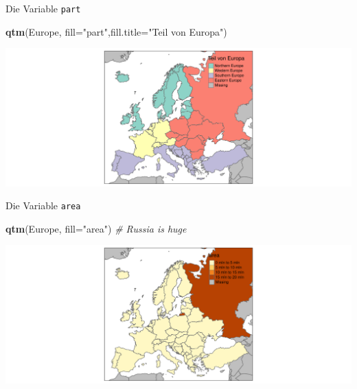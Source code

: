 \documentclass[ignorenonframetext,]{beamer}
\newenvironment{Shaded}{\begin{snugshade}}{\end{snugshade}}
\newcommand{\CommentTok}[1]{\textcolor[rgb]{0.56,0.35,0.01}{\textit{#1}}}
\newcommand{\DataTypeTok}[1]{\textcolor[rgb]{0.13,0.29,0.53}{#1}}
\newcommand{\KeywordTok}[1]{\textcolor[rgb]{0.13,0.29,0.53}{\textbf{#1}}}
\newcommand{\NormalTok}[1]{#1}
\newcommand{\StringTok}[1]{\textcolor[rgb]{0.31,0.60,0.02}{#1}}
\begin{document}
\begin{frame}[fragile]{Die Variable \texttt{part}}
\protect\hypertarget{die-variable-part}{}

\begin{Shaded}
\begin{Highlighting}[]
\KeywordTok{qtm}\NormalTok{(Europe, }\DataTypeTok{fill=}\StringTok{"part"}\NormalTok{,}\DataTypeTok{fill.title=}\StringTok{"Teil von Europa"}\NormalTok{)}
\end{Highlighting}
\end{Shaded}

\includegraphics{A4_tmap_files/figure-beamer/unnamed-chunk-16-1.pdf}

\end{frame}

\begin{frame}[fragile]{Die Variable \texttt{area}}
\protect\hypertarget{die-variable-area}{}

\begin{Shaded}
\begin{Highlighting}[]
\KeywordTok{qtm}\NormalTok{(Europe, }\DataTypeTok{fill=}\StringTok{"area"}\NormalTok{) }\CommentTok{# Russia is huge}
\end{Highlighting}
\end{Shaded}

\includegraphics{A4_tmap_files/figure-beamer/unnamed-chunk-17-1.pdf}

\end{frame}
\end{document}

